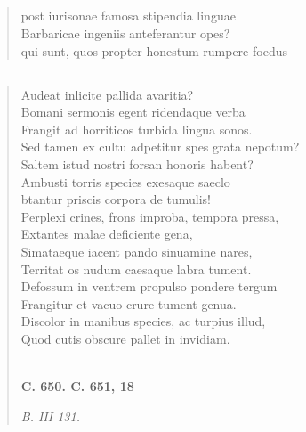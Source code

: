 \documentclass[11pt, a4paper]{report}
\begin{document}
            \subsection*{}
      \begin{verse}
      post iurisonae famosa stipendia linguae \\ Barbaricae ingeniis anteferantur opes? \\ qui sunt, quos propter honestum rumpere foedus \\ 
      \end{verse}
  
            \subsection*{}
      \begin{verse}
      Audeat inlicite pallida avaritia? \\ Bomani sermonis egent ridendaque verba \\ Frangit ad horriticos turbida lingua sonos. \\ Sed tamen ex cultu adpetitur spes grata nepotum? \\ Saltem istud nostri forsan honoris habent? \\ Ambusti torris species exesaque saeclo \\ btantur priscis corpora de tumulis! \\ Perplexi crines, frons improba, tempora pressa, \\ Extantes malae deficiente gena, \\ Simataeque iacent pando sinuamine nares, \\ Territat os nudum caesaque labra tument. \\ Defossum in ventrem propulso pondere tergum \\ Frangitur et vacuo crure tument genua. \\ Discolor in manibus species, ac turpius illud, \\ Quod cutis obscure pallet in invidiam. \\ 
        ﻿\pagebreak 
     \marginpar{[119]} \begin{center} \textbf{C. 650. C. 651, 18} \end{center}\textit{B. III 131.} \\ 
      \end{verse}
  
\end{document}
